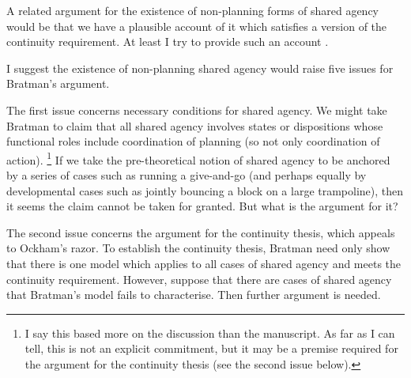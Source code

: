 \documentclass[12pt,letterpaper]{extarticle}
\begin{document}
A related argument for the existence of non-planning forms of shared agency would be that we have a plausible account of it which satisfies a version of the continuity requirement.
At least I try to provide such an account \citep{Butterfill:2011fk,Butterfill:2011_wija}.

I suggest the existence of non-planning shared agency would raise five issues for Bratman's argument.

The first issue concerns necessary conditions for shared agency. 
We might take Bratman to claim that all shared agency involves states or dispositions whose functional roles include coordination of planning (so not only coordination of action).%
\footnote{
I say this based more on the discussion than the manuscript.
As far as I can tell, this is not an explicit commitment, but it may be a premise required for the argument for the continuity thesis (see the second issue below).
}
If we take the pre-theoretical notion of shared agency to be anchored by a series of cases such as running a give-and-go (and perhaps equally by developmental cases such as jointly bouncing a block on a large trampoline), then it seems the claim cannot be taken for granted.
But what is the argument for it?

The second issue concerns the argument for the continuity thesis, which appeals to Ockham's razor.
To establish the continuity thesis, Bratman need only show that there is one model which applies to all cases of shared agency and meets the continuity requirement.
However, suppose that there are cases of shared agency that Bratman's model fails to characterise.
Then further argument is needed. 
\end{document}

